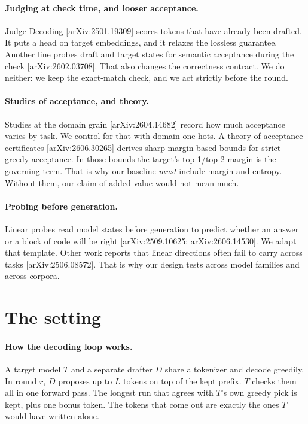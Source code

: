 \documentclass[11pt]{article}
\begin{document}
\paragraph{Judging at check time, and looser acceptance.} Judge Decoding
[arXiv:2501.19309] scores tokens that have already been drafted. It puts a
head on target embeddings, and it relaxes the lossless guarantee. Another
line probes draft and target states for semantic acceptance during the check
[arXiv:2602.03708]. That also changes the correctness contract. We do neither:
we keep the exact-match check, and we act strictly before the round.

\paragraph{Studies of acceptance, and theory.} Studies at the domain grain
[arXiv:2604.14682] record how much acceptance varies by task. We control for
that with domain one-hots. A theory of acceptance certificates
[arXiv:2606.30265] derives sharp margin-based bounds for strict greedy
acceptance. In those bounds the target's top-1/top-2 margin is the governing
term. That is why our baseline \emph{must} include margin and entropy.
Without them, our claim of added value would not mean much.

\paragraph{Probing before generation.} Linear probes read model states before
generation to predict whether an answer or a block of code will be right
[arXiv:2509.10625; arXiv:2606.14530]. We adapt that template. Other work
reports that linear directions often fail to carry across tasks
[arXiv:2506.08572]. That is why our design tests across model families and
across corpora.

\section{The setting}
\label{sec:setting}

\paragraph{How the decoding loop works.} A target model $T$ and a separate
drafter $D$ share a tokenizer and decode greedily. In round $r$, $D$ proposes
up to $L$ tokens on top of the kept prefix. $T$ checks them all in one
forward pass. The longest run that agrees with $T$'s own greedy pick is
kept, plus one bonus token. The tokens that come out are exactly the ones
$T$ would have written alone.
\end{document}
